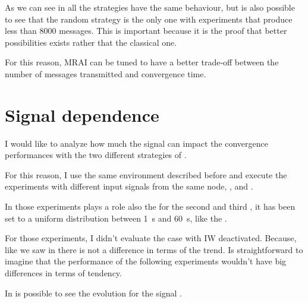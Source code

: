 As we can see in  all the strategies have the same
behaviour, but is also possible to see that the random strategy is the only
one with experiments that produce less than \num{8000} messages.
This is important because it is the proof that better possibilities exists rather
that the classical one.

For this reason, \ac{MRAI} can be tuned to have a better trade-off between
the number of messages transmitted and convergence time.

\section{Signal dependence}
\label{sec:bgp_mrai_signal_dependance}

I would like to analyze how much the signal can impact the convergence performances
with the two different strategies of .

For this reason, I use the same environment described before and execute the
experiments with different input signals from the same node, , 
and .

In those experiments plays a role also the 
for the second and third , it has been set to a uniform distribution
between \SI{1}{\second} and \SI{60}{\second}, like the .

For those experiments, I didn't evaluate the case with \ac{IW} deactivated.
Because, like we saw in
there is not a difference in terms of the trend.
Is straightforward to imagine that the performance of the following experiments
wouldn't have big differences in terms of tendency.

In  is possible to see the evolution
for the signal .


